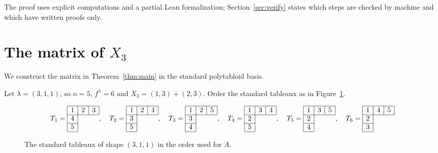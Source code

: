 \documentclass[11pt]{article}
\theoremstyle{remark}
\begin{document}
The proof uses explicit computations and a partial Lean formalization;
Section~\ref{sec:verify} states which steps are checked by machine and which
have written proofs only.

\section{The matrix of \texorpdfstring{$X_3$}{X3}}\label{sec:witness}
We construct the matrix in Theorem~\ref{thm:main} in the standard polytabloid basis. 

Let $\lambda=(3,1,1)$, so $n=5$, $f^\lambda=6$ and $X_3=(1,3)+(2,3)$. Order the standard tableaux as in Figure~\ref{fig:tableaux}.

\begin{figure}[ht]
\centering
\begingroup\setlength{\arraycolsep}{3pt}
\[
T_1=\begin{array}{|c|c|c|}\hline
1&2&3\\\cline{1-3}
4&\multicolumn{2}{c}{}\\\cline{1-1}
5&\multicolumn{2}{c}{}\\\cline{1-1}
\end{array},\quad
T_2=\begin{array}{|c|c|c|}\hline
1&2&4\\\cline{1-3}
3&\multicolumn{2}{c}{}\\\cline{1-1}
5&\multicolumn{2}{c}{}\\\cline{1-1}
\end{array},\quad
T_3=\begin{array}{|c|c|c|}\hline
1&2&5\\\cline{1-3}
3&\multicolumn{2}{c}{}\\\cline{1-1}
4&\multicolumn{2}{c}{}\\\cline{1-1}
\end{array},\quad
T_4=\begin{array}{|c|c|c|}\hline
1&3&4\\\cline{1-3}
2&\multicolumn{2}{c}{}\\\cline{1-1}
5&\multicolumn{2}{c}{}\\\cline{1-1}
\end{array},\quad
T_5=\begin{array}{|c|c|c|}\hline
1&3&5\\\cline{1-3}
2&\multicolumn{2}{c}{}\\\cline{1-1}
4&\multicolumn{2}{c}{}\\\cline{1-1}
\end{array},\quad
T_6=\begin{array}{|c|c|c|}\hline
1&4&5\\\cline{1-3}
2&\multicolumn{2}{c}{}\\\cline{1-1}
3&\multicolumn{2}{c}{}\\\cline{1-1}
\end{array}
\]
\endgroup
\caption{The standard tableaux of shape $(3,1,1)$ in the order used for $A$.}\label{fig:tableaux}
\end{figure}
\end{document}
